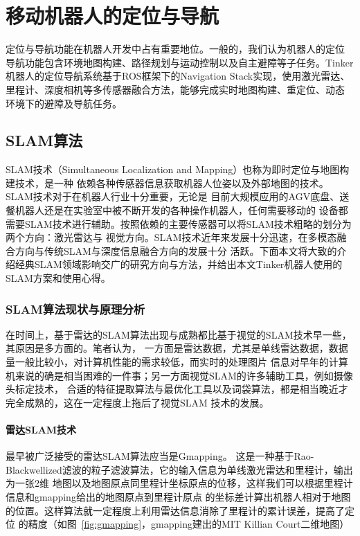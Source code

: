 \chapter{移动机器人的定位与导航}
\label{cha:nav}

定位与导航功能在机器人开发中占有重要地位。一般的，我们认为机器人的定位
导航功能包含环境地图构建、路径规划与运动控制以及自主避障等子任务。Tinker
机器人的定位导航系统基于ROS框架下的Navigation Stack实现，使用激光雷达、
里程计、深度相机等多传感器融合方法，能够完成实时地图构建、重定位、动态
环境下的避障及导航任务。


\section{SLAM算法}

SLAM技术（Simultaneous Localization and Mapping）也称为即时定位与地图构建技术，是一种
依赖各种传感器信息获取机器人位姿以及外部地图的技术。SLAM技术对于在机器人行业十分重要，无论是
目前大规模应用的AGV底盘、送餐机器人还是在实验室中被不断开发的各种操作机器人，任何需要移动的
设备都需要SLAM技术进行辅助。按照依赖的主要传感器可以将SLAM技术粗略的划分为两个方向：激光雷达与
视觉方向。SLAM技术近年来发展十分迅速，在多模态融合方向与传统SLAM与深度信息融合方向的发展十分
活跃。下面本文将大致的介绍经典SLAM领域影响交广的研究方向与方法，并给出本文Tinker机器人使用的
SLAM方案和使用心得。

\subsection{SLAM算法现状与原理分析}

在时间上，基于雷达的SLAM算法出现与成熟都比基于视觉的SLAM技术早一些，其原因是多方面的。笔者认为，
一方面是雷达数据，尤其是单线雷达数据，数据量一般比较小，对计算机性能的需求较低，而实时的处理图片
信息对早年的计算机来说的确是相当困难的一件事；另一方面视觉SLAM的许多辅助工具，例如摄像头标定技术，
合适的特征提取算法与最优化工具以及词袋算法，都是相当晚近才完全成熟的，这在一定程度上拖后了视觉SLAM
技术的发展。

\subsubsection{雷达SLAM技术}

最早被广泛接受的雷达SLAM算法应当是Gmapping\cite{grisettiyz2005improving, grisetti2007improved}。
这是一种基于Rao-Blackwellized滤波的粒子滤波算法，它的输入信息为单线激光雷达和里程计，输出为一张2维
地图以及地图原点同里程计坐标原点的位移，这样我们可以根据里程计信息和gmapping给出的地图原点到里程计原点
的坐标差计算出机器人相对于地图的位置。这样算法就一定程度上利用雷达信息消除了里程计的累计误差，提高了定位
的精度（如图~\ref{fig:gmapping}，gmapping建出的MIT Killian Court二维地图）

